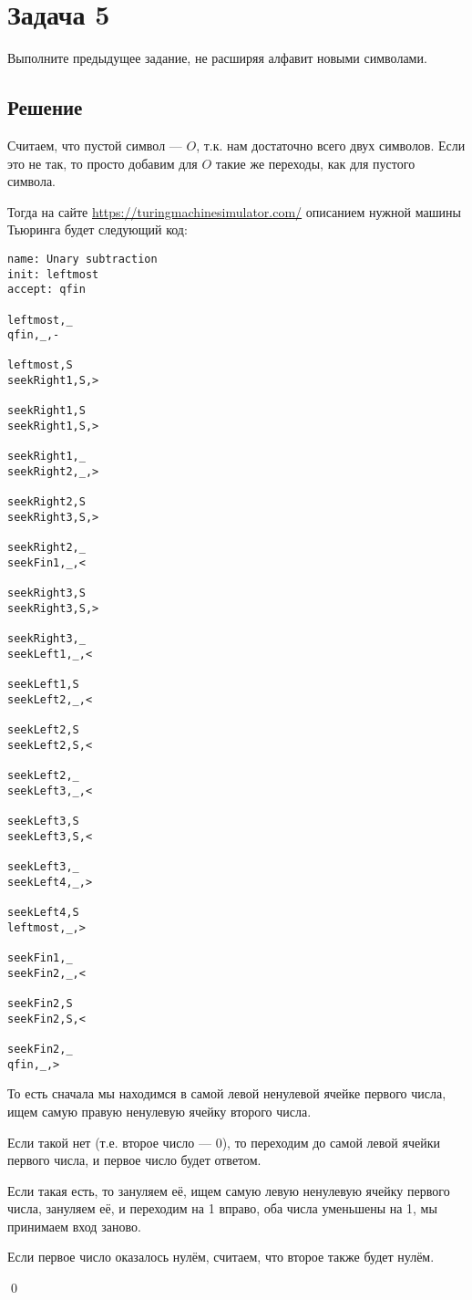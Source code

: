 \section{Задача 5}
Выполните предыдущее задание, не расширяя алфавит новыми символами.

\subsection{Решение}
Считаем, что пустой символ --- $O$, т.к.
нам достаточно всего двух символов.
Если это не так, то просто добавим для $O$
такие же переходы, как для пустого символа.

Тогда на сайте \url{https://turingmachinesimulator.com/}
описанием нужной машины Тьюринга будет следующий код:
\begin{verbatim}
name: Unary subtraction
init: leftmost
accept: qfin

leftmost,_
qfin,_,-

leftmost,S
seekRight1,S,>

seekRight1,S
seekRight1,S,>

seekRight1,_
seekRight2,_,>

seekRight2,S
seekRight3,S,>

seekRight2,_
seekFin1,_,<

seekRight3,S
seekRight3,S,>

seekRight3,_
seekLeft1,_,<

seekLeft1,S
seekLeft2,_,<

seekLeft2,S
seekLeft2,S,<

seekLeft2,_
seekLeft3,_,<

seekLeft3,S
seekLeft3,S,<

seekLeft3,_
seekLeft4,_,>

seekLeft4,S
leftmost,_,>

seekFin1,_
seekFin2,_,<

seekFin2,S
seekFin2,S,<

seekFin2,_
qfin,_,>
\end{verbatim}

То есть сначала мы находимся в самой левой ненулевой ячейке первого числа,
ищем самую правую ненулевую ячейку второго числа.

Если такой нет (т.е. второе число --- 0),
то переходим до самой левой ячейки первого
числа, и первое число будет ответом.

Если такая есть, то зануляем её, ищем самую левую ненулевую
ячейку первого числа, зануляем её, и переходим на 1 вправо,
оба числа уменьшены на 1, мы принимаем вход заново.

Если первое число оказалось нулём, считаем,
что второе также будет нулём.

\qed

